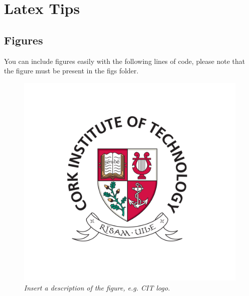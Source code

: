 \documentclass{article} %
\newcommand{\hint}[1] {\par {\bfseries \color{Blue} \it #1 \par}}
\begin{document}
\hint{\color{Maroon}
\newpage 
\section{Latex Tips}
\subsection{Figures}
You can include figures easily with the following lines of code, please note that the figure must be present in the figs folder. 

\begin{figure}[ht!]
  \includegraphics[width=\linewidth]{figs/CITCREST.jpg}
  \caption{\emph{Insert a description of the figure, e.g. CIT logo.}}
  \label{fig:cfair}
\end{figure}

}
\end{document}

